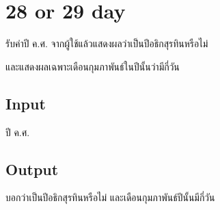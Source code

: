 \documentclass{article}
\begin{document}
\section*{28 or 29 day}

รับค่าปี ค.ศ. จากผู้ใช้แล้วแสดงผลว่าเป็นปีอธิกสุรทินหรือไม่

และแสดงผลเฉพาะเดือนกุมภาพันธ์ในปีนั้นว่ามีกี่วัน\\



\subsection*{Input}
ปี ค.ศ.



\subsection*{Output}
{บอกว่าเป็นปี}{อธิกสุรทินหรือไม่ และเดือนกุมภาพันธ์ปีนั้นมีกี่วัน}\\
\end{document}
